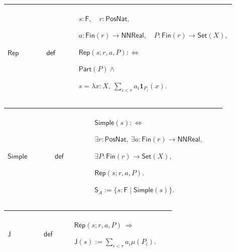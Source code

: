 \documentclass[12pt,reqno]{amsart}
\theoremstyle{blueplain}
\numberwithin{equation}{section}
\begin{document}
{\scriptsize \setlength{\parskip}{0pt}\nointerlineskip
\noindent 
\begin{tabular}{|@{}>{\centering\arraybackslash}m{0.19251\linewidth}|>{\centering\arraybackslash}m{0.16845\linewidth}|>{\centering\arraybackslash}m{0.53904\linewidth}|}
\hline
\hypertarget{def:Rep}{$\displaystyle \mathsf{Rep}$} & $\displaystyle \mathsf{%
def}$ & $\displaystyle s:\mathsf{F},\quad r:\mathsf{PosNat},$\par$%
\displaystyle a:\mathsf{Fin}(r)\to\mathsf{NNReal},\quad P:\mathsf{Fin}(r)\to%
\mathsf{Set}(X),$\par$\displaystyle \mathsf{Rep}(s;r,a,P):\Longleftrightarrow
$\par$\displaystyle \mathsf{Part}(P)\land$\par$\displaystyle s=\lambda x:X,\
\sum_{i<r}a_i\mathbf{1}_{P_i}(x).$ \\ \hline
\end{tabular}%
}

{\scriptsize \setlength{\parskip}{0pt}\nointerlineskip
\noindent 
\begin{tabular}{|@{}>{\centering\arraybackslash}m{0.19251\linewidth}|>{\centering\arraybackslash}m{0.16845\linewidth}|>{\centering\arraybackslash}m{0.53904\linewidth}|}
\hline
\hypertarget{def:Simple}{$\displaystyle \mathsf{Simple}$} & $\displaystyle 
\mathsf{def}$ & $\displaystyle \mathsf{Simple}(s):\Longleftrightarrow$\par$%
\displaystyle \exists r:\mathsf{PosNat},\ \exists a:\mathsf{Fin}(r)\to%
\mathsf{NNReal},$\par$\displaystyle \exists P:\mathsf{Fin}(r)\to\mathsf{Set}%
(X),$\par$\displaystyle \mathsf{Rep}(s;r,a,P).$\par$\displaystyle \mathsf{S}%
_A:=\{s:\mathsf{F}\mid\mathsf{Simple}(s)\}.$ \\ \hline
\end{tabular}%
}

{\scriptsize \setlength{\parskip}{0pt}\nointerlineskip
\noindent 
\begin{tabular}{|@{}>{\centering\arraybackslash}m{0.19251\linewidth}|>{\centering\arraybackslash}m{0.16845\linewidth}|>{\centering\arraybackslash}m{0.53904\linewidth}|}
\hline
\hypertarget{def:J}{$\displaystyle \mathsf{J}$} & $\displaystyle \mathsf{def}
$ & $\displaystyle \mathsf{Rep}(s;r,a,P)\ \Longrightarrow$\par$\displaystyle 
\mathsf{J}(s):=\sum_{i<r}a_i\mu(P_i).$ \\ \hline
\end{tabular}%
}
\end{document}
